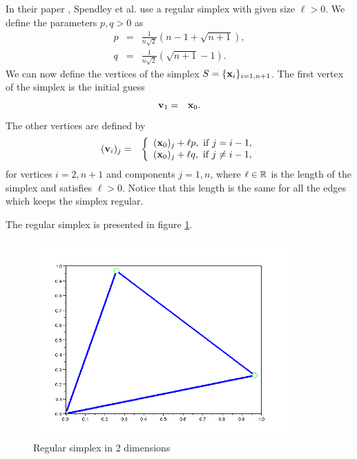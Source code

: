 In their paper \cite{Spendley1962}, Spendley et al. use a regular 
simplex with given size $\ell>0$. We define the parameters $p,q>0$ as 
\begin{eqnarray}
p &=& \frac{1}{n\sqrt{2}} \left(n-1 + \sqrt{n+1}\right), \\
q &=& \frac{1}{n\sqrt{2}} \left(\sqrt{n+1} - 1\right).
\end{eqnarray}
We can now define the vertices of the simplex $S=\{\mathbf{x}_i\}_{i=1,n+1}$.
The first vertex of the simplex is the initial guess 
\begin{eqnarray}
\mathbf{v}_1 &=& \mathbf{x}_0.
\end{eqnarray}
The other vertices are defined by 
\begin{eqnarray}
(\mathbf{v}_i)_j &=& 
\left\{
\begin{array}{l}
(\mathbf{x}_0)_j + \ell p, \textrm{ if } j=i-1,\\
(\mathbf{x}_0)_j + \ell q, \textrm{ if } j\neq i-1,\\
\end{array}
\right.
\end{eqnarray}
for vertices $i=2,n+1$ and components $j=1,n$, 
where $\ell \in\mathbb{R}$ is the length of the simplex and satisfies $\ell>0$. Notice that this 
length is the same for all the edges which keeps the simplex regular.

The regular simplex is presented in figure \ref{fig-nm-simplex-regular}.

\begin{figure}
\begin{center}
\includegraphics[width=10cm]{simplex_regular.png}
\end{center}
\caption{Regular simplex in 2 dimensions}
\label{fig-nm-simplex-regular}
\end{figure}

